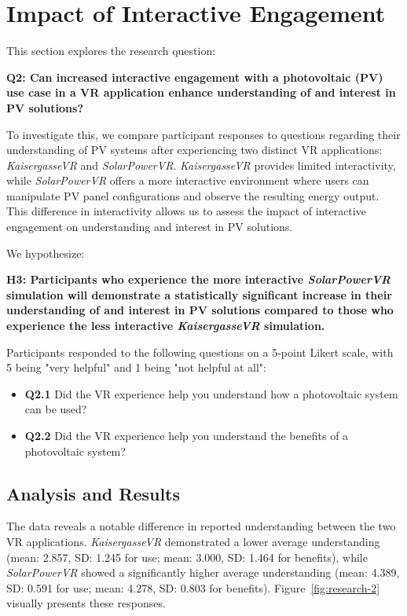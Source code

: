 \documentclass[draft, final]{vutinfth} %
\begin{document}
\section{Impact of Interactive Engagement}

This section explores the research question:

\textbf{Q2: Can increased interactive engagement with a photovoltaic (PV) use case in a VR application enhance understanding of and interest in PV solutions?}

To investigate this, we compare participant responses to questions regarding their understanding of PV systems after experiencing two distinct VR applications: \textit{KaisergasseVR} and \textit{SolarPowerVR}. \textit{KaisergasseVR} provides  limited interactivity, while \textit{SolarPowerVR} offers a more interactive environment where users can manipulate PV panel configurations and observe the resulting energy output. This difference in interactivity allows us to assess the impact of interactive engagement on understanding and interest in PV solutions.

We hypothesize:

\textbf{H3: Participants who experience the more interactive \textit{SolarPowerVR} simulation will demonstrate a statistically significant increase in their understanding of and interest in PV solutions compared to those who experience the less interactive \textit{KaisergasseVR} simulation.}

Participants responded to the following questions on a 5-point Likert scale, with 5 being "very helpful" and 1 being "not helpful at all":

\begin{itemize}
    \item \textbf{Q2.1} Did the VR experience help you understand how a photovoltaic system can be used?
    \item \textbf{Q2.2} Did the VR experience help you understand the benefits of a photovoltaic system?
\end{itemize}

\subsection{Analysis and Results}

The data reveals a notable difference in reported understanding between the two VR applications. \textit{KaisergasseVR} demonstrated a lower average understanding (mean: 2.857, SD: 1.245 for use; mean: 3.000, SD: 1.464 for benefits), while \textit{SolarPowerVR} showed a significantly higher average understanding (mean: 4.389, SD: 0.591 for use; mean: 4.278, SD: 0.803 for benefits). Figure~\ref{fig:research-2} visually presents these responses.
\end{document}

